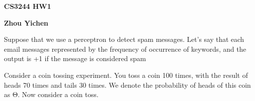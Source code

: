 \documentclass[10pt,a4paper,answers]{exam}
\providecommand{\nline}{\vspace*{.5cm}}
\begin{document}
\begin{center}
{\bf CS3244 HW1}

{\bf Zhou Yichen}
\end{center}

\nline

\begin{questions}
	\question
	Suppose that we use a perceptron to detect spam messages. Let's say that each email messages represented by the frequency of occurrence of keywords, and the output is +1 if the message is considered spam

	\question
	Consider a coin tossing experiment. You toss a coin 100 times, with the result of heads 70 times and tails 30 times. We denote the probability of heads of this coin as Θ. Now consider a coin toss.
	\begin{parts}

\end{parts}
\end{questions}
\end{document}
